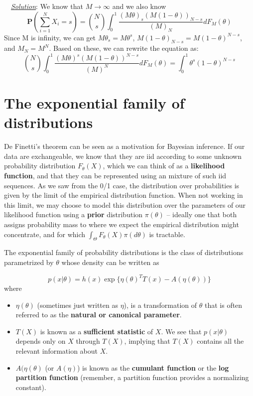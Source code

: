 \documentclass[twoside]{article}
\newenvironment{solution}{
  \begin{flushleft} \noindent ~~\underline{\emph{Solution}}: \rmfamily}{\end{flushleft}}
\newcommand\Prob{\mathbf{P}}
\begin{document}
\begin{solution}
We know that $M \rightarrow \infty$ and we also know 
$$\Prob\left(\sum_{i=1}^N X_i = s\right) = {N\choose s}\int_0^1\frac{(M\theta)_s(M(1-\theta))_{N-s}}{(M)_N}dF_M(\theta)$$
Since M is infinity, we can get $M\theta_s = M\theta^s$, $M(1-\theta)_{N-s} = M(1-\theta)^{N-s}$, and $M_N = M^N$.
Based on these, we can rewrite the equation as: 
$$ {N\choose s}\int_0^1\frac{(M\theta)^s(M(1-\theta))^{N-s}}{(M)^N}dF_M(\theta)  = \int_0^1 \theta^s (1-\theta)^{N-s}$$ 
\end{solution}
  

\section{The exponential family of distributions}

De Finetti's theorem can be seen as a motivation for Bayesian inference. If our data are exchangeable, we know that they are iid according to some unknown probability distribution $F_\theta(X)$, which we can think of as a \textbf{likelihood function}, and that they can be represented using an mixture of such iid sequences. As we saw from the 0/1 case, the distribution over probabilities is given by the limit of the empirical distribution function. When not working in this limit, we may choose to model this distribution over the parameters of our likelihood function using a \textbf{prior} distribution $\pi(\theta)$ -- ideally one that both assigns probability mass to where we expect the empirical distribution might concentrate, and for which $\int_\Theta F_\theta(X) \pi(d\theta)$ is tractable.

The exponential family of probability distributions is the class of distributions parametrized by $\theta$ whose density can be written as

$$p(x|\theta) = h(x)\exp\{\eta(\theta)^TT(x) - A(\eta(\theta))\}$$
where 
\begin{itemize}
\item $\eta(\theta)$ (sometimes just written as $\eta$), is a transformation of $\theta$ that is often referred to as the \textbf{natural or canonical parameter}.
\item $T(X)$ is known as a \textbf{sufficient statistic} of $X$. We see that $p(x|\theta)$ depends only on $X$ through $T(X)$, implying that $T(X)$ contains all the relevant information about $X$.
\item $A(\eta(\theta)$ (or $A(\eta)$) is known as the \textbf{cumulant function} or the \textbf{log partition function} (remember, a partition function provides a normalizing constant).
\end{itemize}
\end{document}
